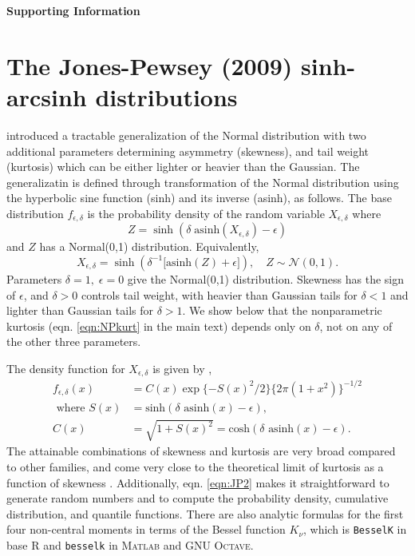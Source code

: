 \documentclass[12pt]{article}
\newcommand{\be}{\begin{equation}}
\newcommand{\ee}{\end{equation}}
\begin{document}
\begin{spacing}{1.35} 
\linenumbers
\centerline{\Large{\textbf{Supporting Information}}}

\section{The Jones-Pewsey (2009) sinh-arcsinh distributions} 
\label{sec:SHASHdist} 
\citet{jones-pewsey-2009} introduced a tractable generalization of the Normal distribution with two 
additional parameters determining asymmetry (skewness), and tail weight (kurtosis) which can be either 
lighter or heavier than the Gaussian. The generalizatin is defined through transformation of the
Normal distribution using the hyperbolic sine function (sinh) and its inverse (asinh), 
as follows. The base distribution $f_{\epsilon,\delta}$  is the 
probability density of the random variable $X_{\epsilon,\delta}$ where  
\be
Z = \sinh (\delta \; \mbox{asinh}(X_{\epsilon,\delta}) - \epsilon)
\label{eqn:JP1}
\ee
and $Z$ has a Normal(0,1) distribution. Equivalently, 
\be
X_{\epsilon,\delta} = \sinh \left( \delta^{-1} \big[\mbox{asinh}(Z) + \epsilon \big] \right), \quad Z \sim \mathcal{N}(0,1).
\label{eqn:JP2}
\ee
Parameters $\delta=1, \; \epsilon=0$ give the Normal(0,1) distribution. Skewness has the sign of $\epsilon$, and
$\delta > 0$ controls tail weight, with heavier than Gaussian tails for $\delta<1$ and lighter than Gaussian tails for $\delta > 1$. We show below that the nonparametric kurtosis (eqn. \eqref{eqn:NPkurt} in the main text) depends 
only on $\delta$, not on any of the other three parameters. 

The density function for $X_{\epsilon,\delta}$ is given by \citet[][eqn. 2]{jones-pewsey-2009}, 
\be
\begin{aligned}
f_{ \epsilon,\delta}(x) & = C(x) \exp\{-S(x)^2/2\} \{2\pi(1+x^2)\}^{-1/2}  \\
 \mbox{ where }  S(x) & =  \mbox{sinh}(\delta \mbox{ asinh}(x)- \epsilon), \\
C(x)  & =  \sqrt{1 + S(x)^2} = \mbox{cosh}(\delta \mbox{ asinh}(x)- \epsilon).
\end{aligned} 
\ee
The attainable combinations of skewness and kurtosis are 
very broad compared to other families, and come very close to the theoretical limit of
kurtosis as a function of skewness \citep[][Fig.  2]{jones-pewsey-2009}. 
Additionally, eqn. \eqref{eqn:JP2} makes it straightforward to generate random numbers and to compute 
the probability density, cumulative distribution, and quantile functions. 
There are also analytic formulas for the first four non-central 
moments \citep[][p. 764]{jones-pewsey-2009} in terms of the Bessel function $K_{\nu}$, which is
\texttt{BesselK} in base R and \texttt{besselk} in \textsc{Matlab} and GNU \textsc{Octave}.


\end{spacing}
\end{document}
